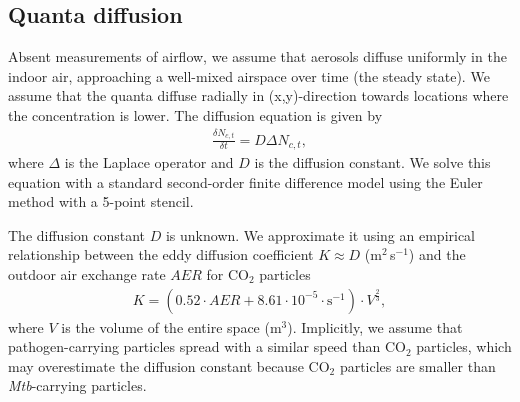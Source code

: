 \documentclass[fleqn,11pt]{wlscirep_supp}
\begin{document}
\subsection{Quanta diffusion}\label{sec:quanta-diffusion}

Absent measurements of airflow, we assume that aerosols diffuse uniformly in the indoor air, approaching a well-mixed airspace over time (the steady state). We assume that the quanta diffuse radially in (x,y)-direction towards locations where the concentration is lower. The diffusion equation is given by 
\begin{align}\label{eq:diffusion}
    \frac{\delta N_{c,t}}{\delta t} = D \Delta N_{c,t},
\end{align}
where $\Delta$ is the Laplace operator and $D$ is the diffusion constant. We solve this equation with a standard second-order finite difference model using the Euler method with a 5-point stencil. 

The diffusion constant $D$ is unknown. We approximate it using an empirical relationship between the eddy diffusion coefficient $K \approx D$ (m$^2$\,s$^{-1}$) and the outdoor air exchange rate $AER$ for CO$_2$ particles\cite{Cheng2011EnvSciTech,Foat2020BE}
\begin{align}
    K = (0.52 \cdot AER + 8.61\cdot10^{-5} \cdot \text{s}^{-1}) \cdot V^{\frac{2}{3}},
\end{align}
where $V$ is the volume of the entire space (m$^3$). Implicitly, we assume that pathogen-carrying particles spread with a similar speed than CO$_2$ particles, which may overestimate the diffusion constant because CO$_2$ particles are smaller than \emph{Mtb}-carrying particles.
\end{document}
